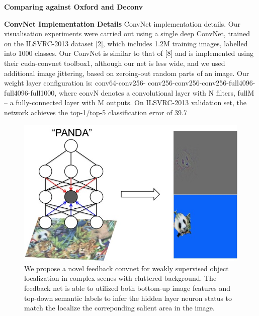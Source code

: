 \textbf{Comparing against Oxford and Deconv}

\textbf{ConvNet Implementation Details}
ConvNet implementation details. Our visualisation experiments were carried out using a single deep ConvNet, trained on the ILSVRC-2013 dataset [2], which includes 1.2M training images, labelled into 1000 classes. Our ConvNet is similar to that of [8] and is implemented using their cuda-convnet toolbox1, although our net is less wide, and we used additional image jittering, based on zeroing-out random parts of an image. Our weight layer configuration is: conv64-conv256- conv256-conv256-conv256-full4096-full4096-full1000, where convN denotes a convolutional layer with N filters, fullM – a fully-connected layer with M outputs. On ILSVRC-2013 validation set, the network achieves the top-1/top-5 classification error of 39.7%

\setlength{\tabcolsep}{2pt}
\begin{figure}
\begin{center}
\includegraphics[width=0.95\columnwidth]{figs/splash/splash}
\caption{We propose a novel feedback convnet for weakly supervised object localization in complex scenes with cluttered background. The feedback net is able to utilized both bottom-up image features and top-down semantic labels to infer the hidden layer neuron status to match the localize the correponding salient area in the image. }
\label{fig:splash0}
\end{center}
\end{figure}

